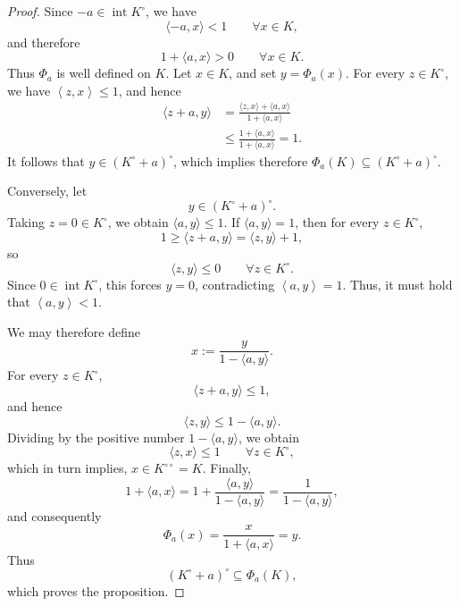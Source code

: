 \documentclass[10pt,a4paper]{amsart}
\newcommand{\ip}[2]{\left\langle #1,#2\right\rangle}
\begin{document}
\begin{proof}
Since \(-a\in\operatorname{int}K^\circ\), we have
\[
\langle -a,x\rangle<1
\qquad \forall x\in K,
\]
and therefore
\[
1+\langle a,x\rangle>0
\qquad \forall x\in K.
\]
Thus \(\Phi_a\) is well defined on \(K\).
Let \(x\in K\), and set $y=\Phi_a(x)$. 
For every \(z\in K^\circ\), we have $\ip{z}{x} \leq 1$, and hence
\[
\begin{aligned}
\langle z+a,y\rangle
&=
\frac{\langle z,x\rangle+\langle a,x\rangle}
     {1+\langle a,x\rangle} \\
&\leq
\frac{1+\langle a,x\rangle}
     {1+\langle a,x\rangle}
=1.
\end{aligned}
\]
It follows that $y\in(K^\circ+a)^\circ$, which implies
therefore
\(
\Phi_a(K)\subseteq(K^\circ+a)^\circ.
\)

Conversely, let
\[
y\in(K^\circ+a)^\circ.
\]
Taking \(z=0\in K^\circ\), we obtain
\(
\langle a,y\rangle\leq1.
\)
If \(\langle a,y\rangle=1\), then for every \(z\in K^\circ\),
\[
1\geq\langle z+a,y\rangle
=\langle z,y\rangle+1,
\]
so
\[
\langle z,y\rangle\leq0
\qquad \forall z\in K^\circ.
\]
Since \(0\in\operatorname{int}K^\circ\), this forces \(y=0\), contradicting
\(\ip{a}{y}=1\). Thus, it must hold that $\ip{a}{y} < 1.$

We may therefore define
\[
x:=\frac{y}{1-\langle a,y\rangle}.
\]
For every \(z\in K^\circ\),
\[
\langle z+a,y\rangle\leq1,
\]
and hence
\[
\langle z,y\rangle
\leq1-\langle a,y\rangle.
\]
Dividing by the positive number \(1-\langle a,y\rangle\), we obtain
\[
\langle z,x\rangle\leq1
\qquad \forall z \in K^\circ,
\]which in turn implies, 
\(
x\in K^{\circ\circ}=K.
\)
Finally,
\[
1+\langle a,x\rangle
=
1+\frac{\langle a,y\rangle}{1-\langle a,y\rangle}
=
\frac{1}{1-\langle a,y\rangle},
\]
and consequently
\[
\Phi_a(x)
=
\frac{x}{1+\langle a,x\rangle}
=
y.
\]
Thus
\[
(K^\circ+a)^\circ\subseteq\Phi_a(K),
\]
which proves the proposition.
\end{proof}
\end{document}
